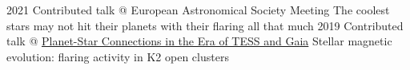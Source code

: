 \documentclass[11pt]{k-cv} %
\begin{document}
\begin{entrylist}
\entry
{2021}
{Contributed talk @ European Astronomical Society Meeting}
{}%
{The coolest stars may not hit their planets with their flaring all that much}
\entry
{2019}
{Contributed talk @ \href{https://www.kitp.ucsb.edu/activities/exostar-c19}{Planet-Star Connections in the Era of TESS and Gaia}}
{}%
{Stellar magnetic evolution: flaring activity in K2 open clusters}

\end{entrylist}
\end{document}
